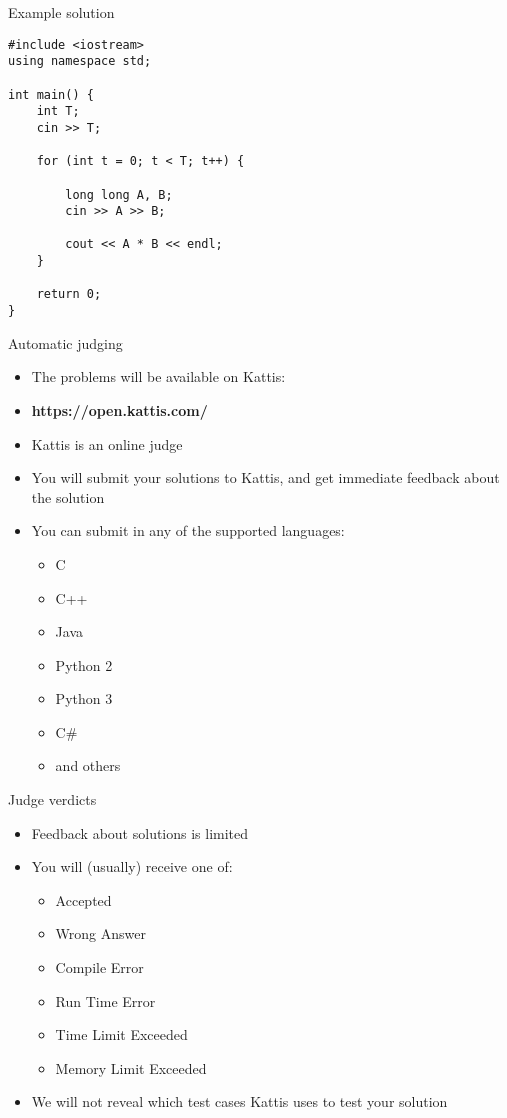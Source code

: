 \documentclass[10pt]{beamer}
\newcommand{\bi}{\begin{itemize}}
\newcommand{\ei}{\end{itemize}}
\begin{document}
\begin{frame}[fragile]{Example solution}
    \begin{verbatim}
#include <iostream>
using namespace std;

int main() {
    int T;
    cin >> T;

    for (int t = 0; t < T; t++) {

        long long A, B;
        cin >> A >> B;

        cout << A * B << endl;
    }

    return 0;
}
\end{verbatim}

    \bi
    \ei
\end{frame}


\begin{frame}{Automatic judging}
    \bi
        \item The problems will be available on Kattis:
        \item \textbf{https://open.kattis.com/}
        \vspace{20pt}
        \item Kattis is an online judge
        \item You will submit your solutions to Kattis, and get immediate feedback about the solution
        \item You can submit in any of the supported languages:
            \bi
                \item C
                \item C++
                \item Java
                \item Python 2
                \item Python 3
                \item C\#{}
                \item and others
            \ei
    \ei
\end{frame}

\begin{frame}{Judge verdicts}
    \bi
        \item Feedback about solutions is limited
        \item You will (usually) receive one of:
            \bi
                \item Accepted
                \item Wrong Answer
                \item Compile Error
                \item Run Time Error
                \item Time Limit Exceeded
                \item Memory Limit Exceeded
            \ei

        \item We will not reveal which test cases Kattis uses to test your solution
    \ei
\end{frame}
\end{document}
